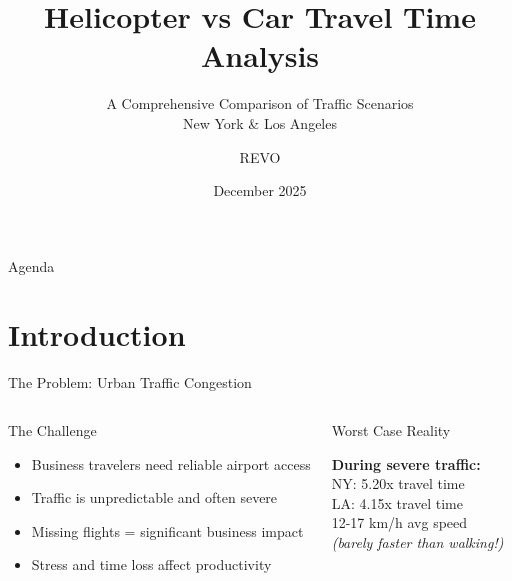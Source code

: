 \documentclass[aspectratio=169,9pt]{beamer}
\title[\textbf{REVO CITY EXPANSION: Helicopter vs Car}]{\textbf{Helicopter vs Car Travel Time Analysis}}
\subtitle{A Comprehensive Comparison of Traffic Scenarios\\New York \& Los Angeles}
\author{REVO}
\date{December 2025}
\begin{document}
\begin{frame}
\titlepage
\end{frame}

\begin{frame}{Agenda}
\tableofcontents
\end{frame}

\section{Introduction}

\begin{frame}{The Problem: Urban Traffic Congestion}
\begin{columns}
\begin{block}{The Challenge}
\begin{itemize}
    \item Business travelers need reliable airport access
    \item Traffic is unpredictable and often severe
    \item Missing flights = significant business impact
    \item Stress and time loss affect productivity
\end{itemize}
\end{block}

\begin{alertblock}{Worst Case Reality}
\begin{center}
\textbf{During severe traffic:}\\[0.3em]
\large{NY: \textcolor{revoRed}{5.20x}} \small{travel time}\\[0.2em]
\large{LA: \textcolor{revoRed}{4.15x}} \small{travel time}\\[0.2em]
\large{\textcolor{revoRed}{12-17 km/h}} \small{avg speed}\\[0.2em]
\footnotesize{\textit{(barely faster than walking!)}}
\end{center}
\end{alertblock}
\end{columns}
\end{frame}
\end{document}
